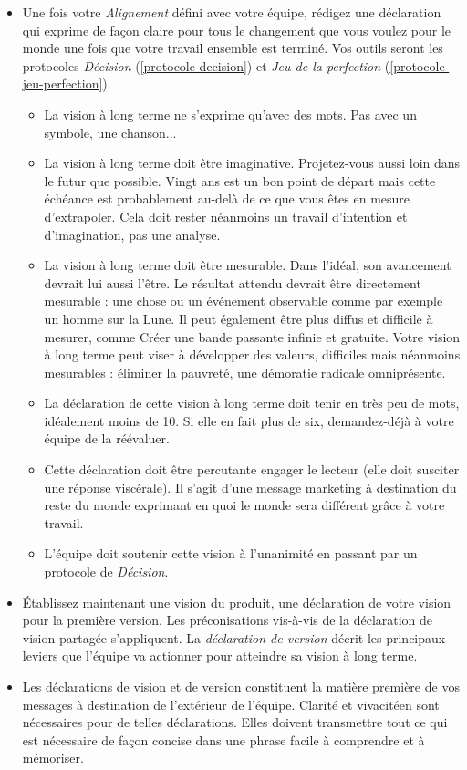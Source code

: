 \documentclass[paper=6in:9in,pagesize=pdftex,headinclude=on,footinclude=on,11pt]{scrbook}
\newcommand*{\numref}[1]{{\hyperref[{#1}]{\autoref*{#1}}}}
\begin{document}
\begin{itemize}
	\item Une fois votre \emph{Alignement} défini avec votre équipe, rédigez une déclaration qui exprime de façon claire
	      pour tous le changement que vous voulez pour le monde une fois que votre travail ensemble est terminé.
	      Vos outils seront les protocoles \emph{Décision} (\numref{protocole-decision}) et \emph{Jeu de la perfection}
	      (\numref{protocole-jeu-perfection}).
	      \begin{itemize}
	      	\item La vision à long terme ne s'exprime qu'avec des mots. Pas avec un symbole, une chanson...
	      	\item La vision à long terme doit être imaginative. Projetez-vous aussi loin dans le futur que possible.
	      	      Vingt ans est un bon point de départ mais cette échéance est probablement au-delà de ce que vous
	      	      êtes en mesure d'extrapoler. Cela doit rester néanmoins un travail d'intention et d'imagination,
	      	      pas une analyse.
	      	\item La vision à long terme doit être mesurable. Dans l'idéal, son avancement devrait lui aussi l'être.
	      	      Le résultat attendu devrait être directement mesurable : une chose ou un événement observable comme
	      	      par exemple \og{}un homme sur la Lune\fg{}. Il peut également être plus diffus et difficile à mesurer,
	      	      comme \og{}Créer une bande passante infinie et gratuite\fg{}. Votre vision à long terme peut viser à
	      	      développer des valeurs, difficiles mais néanmoins mesurables : \og{}éliminer la pauvreté\fg{},
	      	      \og{}une démoratie radicale omniprésente\fg{}.
			\item La déclaration de cette vision à long terme doit tenir en très peu de mots, idéalement moins de 10.
			      Si elle en fait plus de six, demandez-déjà à votre équipe de la réévaluer.
			\item Cette déclaration doit être percutante engager le lecteur (elle doit susciter une réponse viscérale).
			      Il s'agit d'une message marketing à destination du reste du monde exprimant en quoi le monde sera
			      différent grâce à votre travail.
			\item L'équipe doit soutenir cette vision à l'unanimité en passant par un protocole de \emph{Décision}.
	      \end{itemize}
	\item Établissez maintenant une vision du produit, une déclaration de votre vision pour la première version. Les
	      préconisations vis-à-vis de la déclaration de vision partagée s'appliquent. La \emph{déclaration de version}
	      décrit les principaux leviers que l'équipe va actionner pour atteindre sa vision à long terme.
	\item Les déclarations de vision et de version constituent la matière première de vos messages à destination de
	      l'extérieur de l'équipe. Clarité et vivacitéen sont nécessaires pour de telles déclarations. Elles doivent
	      transmettre tout ce qui est nécessaire de façon concise dans une phrase facile à comprendre et à mémoriser.
\end{itemize}
\end{document}
